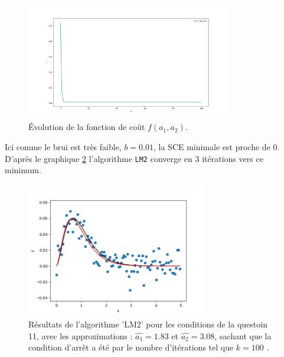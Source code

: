 \documentclass[12pt]{article}
\begin{document}
   \begin{figure}[H]
\centering
\includegraphics[width=0.8\textwidth]{Q162F.png}
\caption{Évolution de la fonction de coût $f(a_1, a_2)$.}
\label{FigQ162F}
\end{figure}

Ici comme le brui est très faible, $b=0.01$, la SCE minimale est proche de 0. D'après le graphique \ref{FigQ162F}  l'algorithme \verb|LM2| converge en 3 itérations vers ce minimum.

   \begin{figure}[H]
\centering
\includegraphics[width=0.7\textwidth]{Q163.png}
\caption{Résultats de l'algorithme 'LM2' pour les conditions de la questoin 11, avec les approximations : $\hat{a_1}= 1.83$ et $\hat{a_2}= 3.08$, sachant que la condition d'arrêt a été par le nombre d'itérations tel que $k=100$ .}
\label{FigQ162F}
\end{figure}

   
\end{document}
